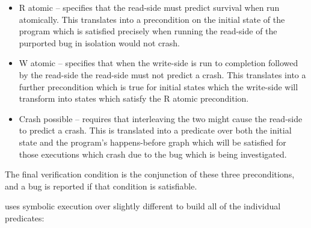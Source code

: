 \begin{itemize}
\item
  R atomic -- specifies that the read-side {\StateMachine} must
  predict survival when run atomically.  This translates into a
  precondition on the initial state of the program which is satisfied
  precisely when running the read-side of the purported bug in
  isolation would not crash.
\item
  W atomic -- specifies that when the write-side {\StateMachine} is
  run to completion followed by the read-side {\StateMachine} the
  read-side {\StateMachine} must not predict a crash.  This translates into a further precondition which is
  true for initial states which the write-side {\StateMachine} will
  transform into states which satisfy the R atomic precondition.
\item
  Crash possible -- requires that interleaving the two
  {\StateMachines} might cause the read-side {\StateMachine} to
  predict a crash.  This is translated into a predicate over both the
  initial state and the program's happens-before graph which will be
  satisfied for those executions which crash due to the bug which is
  being investigated.
\end{itemize}

  The final verification condition is the
conjunction of these three preconditions, and a bug is reported if
that condition is satisfiable.

{\Technique} uses symbolic execution over slightly different
{\StateMachines} to build all of the individual predicates:

